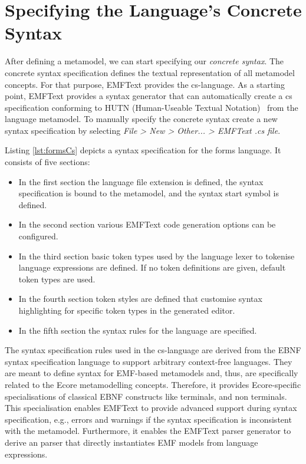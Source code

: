 \section{Specifying the Language's Concrete Syntax}
\label{sec:process_specification}

	After defining a metamodel, we can start specifying our
	\emph{concrete syntax}. The concrete syntax specification defines 
	the textual representation of all metamodel
	concepts. For that purpose, EMFText provides the cs-language. 
	As a starting point, EMFText provides a syntax generator that can
	automatically create a cs specification conforming to HUTN (Human-Useable
	Textual Notation)~\cite{HUTN} from the language metamodel. 
	To manually specify the concrete syntax create a
	new syntax specification by selecting \emph{File > New > Other... > EMFText .cs
	file}.

	\noindent Listing \ref{lst:formsCs} depicts a syntax specification for the forms
	language. It consists of five sections: 
	\begin{itemize}
	  \item In the first section the language file
		extension is defined, the syntax specification is bound to the metamodel, 
		and the syntax start symbol is defined.
	  \item In the second section various EMFText code generation options can be
	  	configured.
	  \item  In the third section basic token types used by the language
	  	lexer to tokenise language expressions are defined. If no token definitions
	 	are given, default token types are used. 	
	  \item In the fourth section token styles are defined that customise syntax
	  	highlighting for specific token types in the generated editor.
	  \item In the fifth section the syntax rules for the language are specified.	
	\end{itemize}
	
		The syntax specification rules used in the cs-language are derived from the
		EBNF syntax specification language to support arbitrary context-free languages.
		They are meant to define syntax for EMF-based metamodels and, thus, are
		specifically related to the Ecore metamodelling concepts. Therefore, it provides
		Ecore-specific specialisations of classical EBNF constructs like terminals, and
		non terminals. This specialisation enables EMFText to provide advanced support 
		during syntax specification, e.g., errors and warnings if the syntax
		specification is inconsistent with the metamodel. Furthermore, it enables the
		EMFText parser generator to derive an parser that directly instantiates EMF
		models from language expressions.


